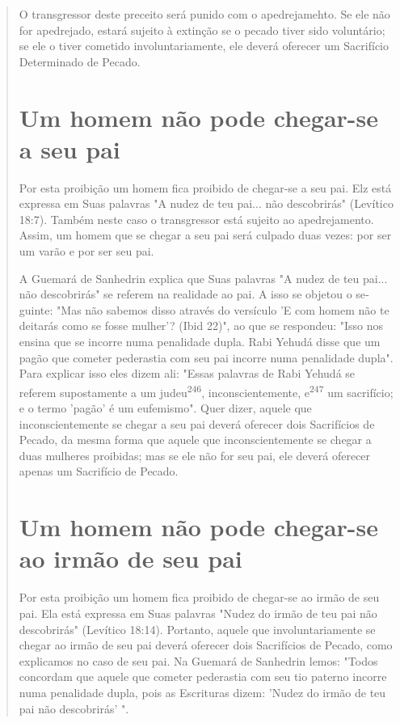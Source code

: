 \begin{quote}
O transgressor deste preceito será punido com o apedrejamehto. Se ele
não for apedrejado, estará sujeito à extinção se o pecado tiver sido
voluntá­rio; se ele o tiver cometido involuntariamente, ele deverá
oferecer um Sacrifí­cio Determinado de Pecado.

\section{Um homem não pode chegar-se a seu pai}

Por esta proibição um homem fica proibido de chegar-se a seu pai. Elz
está expressa em Suas palavras "A nudez de teu pai... não descobrirás"
(Le­vítico 18:7). Também neste caso o transgressor está sujeito ao
apedrejamento. Assim, um homem que se chegar a seu pai será culpado duas
vezes: por ser um varão e por ser seu pai.

A Guemará de Sanhedrin explica que Suas palavras "A nudez de teu pai...
não descobrirás" se referem na realidade ao pai. A isso se objetou o
se­guinte: "Mas não sabemos disso através do versículo 'E com homem não
te dei­tarás como se fosse mulher'? (Ibid 22)", ao que se respondeu:
"Isso nos ensina que se incorre numa penalidade dupla. Rabi Yehudá disse
que um pagão que cometer pederastia com seu pai incorre numa penalidade
dupla". Para explicar isso eles dizem ali: "Essas palavras de Rabi
Yehudá se referem supostamente a um judeu\textsuperscript{246},
inconscientemente, e\textsuperscript{247} um sacrifício; e o termo
'pagão' é um eufemismo". Quer dizer, aquele que inconscientemente se
chegar a seu pai de­verá oferecer dois Sacrifícios de Pecado, da mesma
forma que aquele que in­conscientemente se chegar a duas mulheres
proibidas; mas se ele não for seu pai, ele deverá oferecer apenas um
Sacrifício de Pecado.

\section{Um homem não pode chegar-se ao irmão de seu pai}

Por esta proibição um homem fica proibido de chegar-se ao irmão de seu
pai. Ela está expressa em Suas palavras "Nudez do irmão de teu pai não
descobrirás" (Levítico 18:14). Portanto, aquele que involuntariamente se
che­gar ao irmão de seu pai deverá oferecer dois Sacrifícios de Pecado,
como expli­camos no caso de seu pai. Na Guemará de Sanhedrin lemos:
"Todos concor­dam que aquele que cometer pederastia com seu tio paterno
incorre numa pe­nalidade dupla, pois as Escrituras dizem: 'Nudez do
irmão de teu pai não descobrirás' ".
\end{quote}

